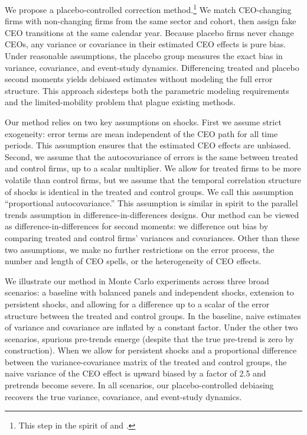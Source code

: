 \documentclass[11pt,a4paper]{article}
\begin{document}
We propose a placebo-controlled correction method.\footnote{This step in the spirit of \cite{fitza2014use} and \cite{jarosiewicz2023revisiting}.} We match CEO-changing firms with non-changing firms from the same sector and cohort, then assign fake CEO transitions at the same calendar year. Because placebo firms never change CEOs, any variance or covariance in their estimated CEO effects is pure bias. Under reasonable assumptions, the placebo group measures the exact bias in variance, covariance, and event-study dynamics. Differencing treated and placebo second moments yields debiased estimates without modeling the full error structure. This approach sidesteps both the parametric modeling requirements and the limited-mobility problem that plague existing methods.

Our method relies on two key assumptions on shocks. First we assume strict exogeneity: error terms are mean independent of the CEO path for all time periods. This assumption ensures that the estimated CEO effects are unbiased. Second, we assume that the autocovariance of errors is the same between treated and control firms, up to a scalar multiplier. We allow for treated firms to be more volatile than control firms, but we assume that the temporal correlation structure of shocks is identical in the treated and control groups. We call this assumption ``proportional autocovariance.'' This assumption is similar in spirit to the parallel trends assumption in difference-in-differences designs. Our method can be viewed as difference-in-differences for second moments: we difference out bias by comparing treated and control firms' variances and covariances. Other than these two assumptions, we make no further restrictions on the error process, the number and length of CEO spells, or the heterogeneity of CEO effects. 

We illustrate our method in Monte Carlo experiments across three broad scenarios: a baseline with balanced panels and independent shocks, extension to persistent shocks, and allowing for a difference up to a scalar of the error structure between the treated and control groups. In the baseline, naive estimates of variance and covariance are inflated by a constant factor. Under the other two scenarios, spurious pre-trends emerge (despite that the true pre-trend is zero by construction). When we allow for persistent shocks and a proportional difference between the variance-covariance matrix of the treated and control groups, the naive variance of the CEO effect is upward biased by a factor of 2.5 and pretrends become severe. In all scenarios, our placebo-controlled debiasing recovers the true variance, covariance, and event-study dynamics.
\end{document}
